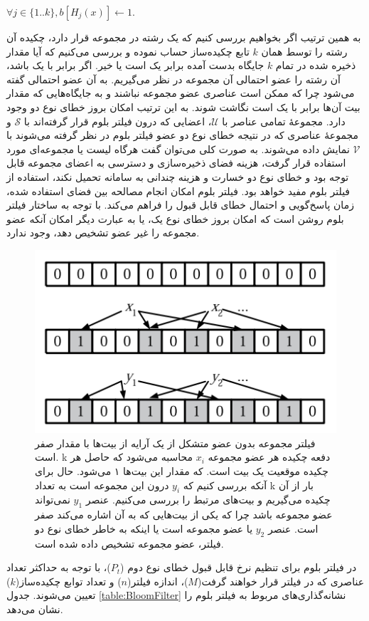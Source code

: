 $\forall j\in \{1..k\}, b[H_j(x)] \leftarrow 1$.

به همین ترتیب اگر بخواهیم بررسی کنیم که یک رشته در مجموعه قرار دارد، چکیده آن رشته را توسط همان $k$ تابع چکیده‌ساز حساب نموده و بررسی می‌کنیم که آیا مقدار ذخیره شده در تمام $k$ جایگاه بدست آمده برابر یک است یا خیر. اگر برابر با یک باشد، آن رشته را عضو احتمالی آن مجموعه در نظر می‌گیریم. به آن عضو احتمالی گفته می‌شود چرا که ممکن است عناصری عضو مجموعه نباشند و به جایگاه‌هایی که مقدار  بیت آن‌ها برابر با یک است نگاشت شوند. به این ترتیب امکان بروز خطای نوع دو وجود دارد. مجموعهٔ تمامی عناصر با $\mathcal{U}$، اعضایی که درون فیلتر بلوم قرار گرفته‌اند با $\mathcal{S}$ و مجموعهٔ عناصری که در نتیجه خطای نوع دو عضو فیلتر بلوم در نظر گرفته می‌شوند با $\mathcal{V}$ نمایش داده می‌شوند. به صورت کلی می‌توان گفت هرگاه لیست یا مجموعه‌ای مورد استفاده قرار گرفت، هزینه فضای ذخیره‌سازی و دسترسی به اعضای مجموعه قابل توجه بود و خطای نوع دو خسارت و هزینه چندانی به سامانه تحمیل نکند، استفاده از فیلتر بلوم مفید خواهد بود. فیلتر بلوم امکان انجام مصالحه بین فضای استفاده شده، زمان پاسخ‌گویی و احتمال خطای قابل قبول را فراهم می‌کند\cite{Bloom1970}. با توجه به ساختار فیلتر بلوم روشن است که امکان بروز خطای نوع یک، یا به عبارت دیگر امکان آنکه عضو مجموعه را غیر عضو تشخیص دهد، وجود ندارد.

\begin{figure}
	\centering
	\includegraphics[width=0.55\linewidth]{image/BloomFilter}
	\caption[نمونه‌ای از عمکلرد فیلتر بلوم]{
		فیلتر مجموعه بدون عضو متشکل از یک آرایه‌ از بیت‌ها با مقدار صفر است. k دفعه چکیده هر عضو مجموعه $x_i$ محاسبه می‌شود که حاصل هر چکیده موقعیت یک بیت است. که مقدار این بیت‌ها ۱ می‌شود. حال برای آنکه بررسی کنیم که $y_i$ درون این مجموعه است به تعداد k بار از آن چکیده می‌گیریم و بیت‌های مرتبط را بررسی می‌کنیم. عنصر $y_1$ نمی‌تواند عضو مجموعه باشد چرا که یکی از بیت‌هایی که به آن اشاره می‌کند صفر است. عنصر $y_2$ یا عضو مجموعه است یا اینکه به خاطر خطای نوع دو فیلتر، عضو مجموعه تشخیص داده شده است.\cite{Broder2004}
	}
	\label{fig:bloomfilter}
\end{figure}

در فیلتر بلوم برای تنظیم نرخ قابل قبول خطای نوع دوم ($P_t$)، با توجه به حداکثر تعداد عناصری که در فیلتر قرار خواهند گرفت($M$)، اندازه فیلتر($n$) و تعداد توابع‌ چکیده‌ساز($k$) تعیین می‌شوند.
جدول \ref{table:BloomFilter} نشانه‌گذاری‌های مربوط به فیلتر بلوم را نشان می‌دهد.

